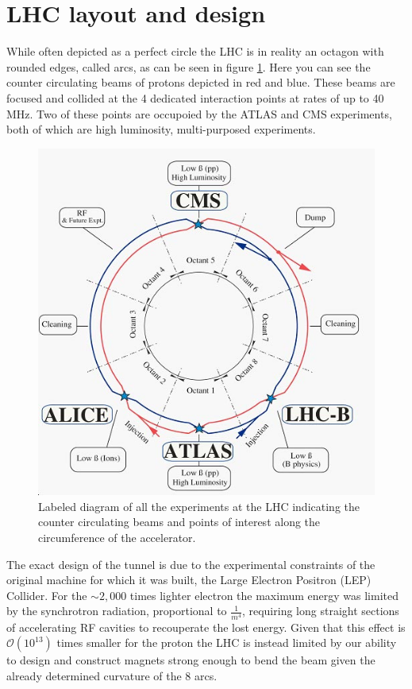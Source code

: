 \section{LHC layout and design} \label{sec:lhc:layout}

While often depicted as a perfect circle the LHC is in reality an octagon with
rounded edges, called arcs, as can be seen in figure \ref{fig:lhc_schematic}.
Here you can see the counter circulating beams of protons depicted in red and
blue.  These beams are focused and collided at the 4 dedicated interaction
points at rates of up to 40 MHz.  Two of these points are occupoied by the
ATLAS and CMS experiments, both of which are high luminosity, multi-purposed
experiments.

\begin{figure}[!htbp] 
  \begin{center}
    \includegraphics[width=0.9\linewidth]{figures/lhc/lhc_schematic.jpg}
    \caption{Labeled diagram of all the experiments at the LHC indicating the
counter circulating beams and points of interest along the circumference of the
accelerator.} 
    \label{fig:lhc_schematic} 
  \end{center} 
\end{figure}

The exact design of the tunnel is due to the experimental constraints of the
original machine for which it was built, the Large Electron Positron (LEP)
Collider.  For the $\sim 2,000$ times lighter electron the maximum energy was
limited by the synchrotron radiation, proportional to $\frac{1}{m^4}$, requiring
long straight sections of accelerating RF cavities to recouperate the lost
energy.  Given that this effect is $\mathcal{O}(10^{13})$ times smaller for the
proton the LHC is instead limited by our ability to design and construct magnets
strong enough to bend the beam given the already determined curvature of the 8
arcs.

